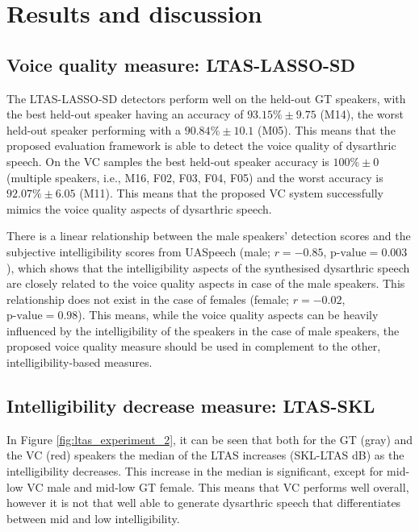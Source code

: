 \documentclass[a4paper]{article}
\begin{document}
\section{Results and discussion}
\label{sec:results}

\subsection{Voice quality measure: LTAS-LASSO-SD}


The LTAS-LASSO-SD detectors perform well on the held-out GT speakers, with the best held-out speaker having an accuracy of $93.15\% \pm 9.75 $ (M14), the worst held-out speaker performing with a $90.84\% \pm 10.1$ (M05). This means that the proposed evaluation framework is able to detect the voice quality of dysarthric speech. On the VC samples the best held-out speaker accuracy is $100\% \pm 0$ (multiple speakers, i.e., M16, F02, F03, F04, F05) and the worst accuracy is $92.07\% \pm  6.05$ (M11). This means that the proposed VC system successfully mimics the voice quality aspects of dysarthric speech.

There is a linear relationship between the male speakers' detection scores and the subjective intelligibility scores from UASpeech (male; $r = -0.85$, $ \text{p-value} = 0.003$), which shows that the intelligibility aspects of the synthesised dysarthric speech are closely related to the voice quality aspects in case of the male speakers. This relationship does not exist in the case of females (female; $r = -0.02$, $ \text{p-value} = 0.98$). This means, while the voice quality aspects can be heavily influenced by the intelligibility of the speakers in the case of male speakers, the proposed voice quality measure should be used in complement to the other, intelligibility-based measures.


\subsection{Intelligibility decrease measure: LTAS-SKL}

In Figure \ref{fig:ltas_experiment_2}, it can be seen that both for the GT (gray) and the VC (red) speakers the median of the LTAS increases (SKL-LTAS dB) as the intelligibility decreases. This increase in the median is significant, except for mid-low VC male and mid-low GT female. This means that VC performs well overall, however it is not that well able to generate dysarthric speech that differentiates between mid and low intelligibility. 
\end{document}
